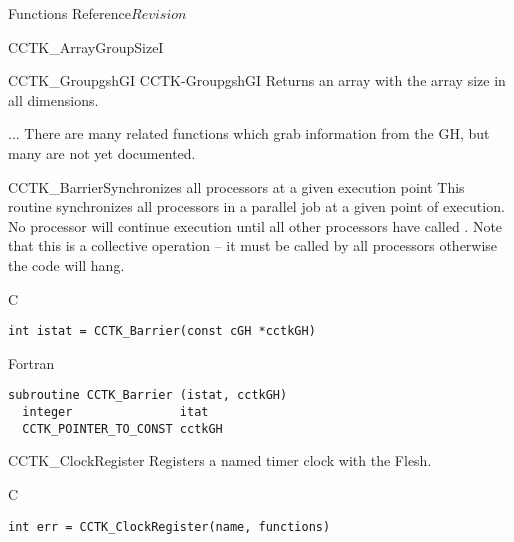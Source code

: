 \begin{cactuspart}{ Functions Reference}{}{$Revision$}
\begin{FunctionDescription}{CCTK\_ArrayGroupSizeI}{}
\begin{SeeAlsoSection}
\begin{SeeAlso2} {CCTK\_GroupgshGI} {CCTK-GroupgshGI}
Returns an array with the array size in all dimensions.
\end{SeeAlso2}
\begin{SeeAlso}{...}
There are many related functions which grab information from the GH,
but many are not yet documented.
\end{SeeAlso}
\end{SeeAlsoSection}
\end{FunctionDescription}



\begin{FunctionDescription}{CCTK\_Barrier}{Synchronizes all processors at a given execution point}
\label{CCTK-Barrier}
This routine synchronizes all processors in a parallel job at a given point of
execution. No processor will continue execution until all other processors
have called . Note that this is a collective operation --
it must be called by all processors otherwise the code will hang.
\begin{SynopsisSection}
\begin{Synopsis}{C}
\begin{verbatim}
int istat = CCTK_Barrier(const cGH *cctkGH)
\end{verbatim}
\end{Synopsis}
\begin{Synopsis}{Fortran}
\begin{verbatim}
subroutine CCTK_Barrier (istat, cctkGH)
  integer               itat
  CCTK_POINTER_TO_CONST cctkGH
\end{verbatim}
\end{Synopsis}
\end{SynopsisSection}
\end{FunctionDescription}



\begin{FunctionDescription}{CCTK\_ClockRegister}
\label{CCTK-ClockRegister}
Registers a named timer clock with the Flesh.
\begin{SynopsisSection}
\begin{Synopsis}{C}
\begin{verbatim}
int err = CCTK_ClockRegister(name, functions)
\end{verbatim}
\end{Synopsis}
\end{SynopsisSection}


\end{FunctionDescription}
\end{cactuspart}
